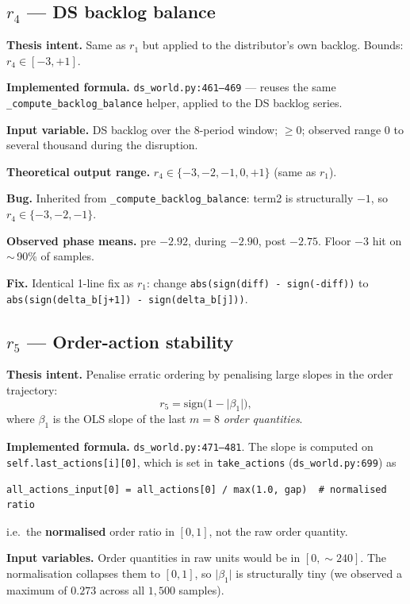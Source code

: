 \documentclass[11pt,letterpaper]{article}
\newcommand{\code}[1]{\texttt{\small #1}}
\begin{document}
\subsection{$r_4$ --- DS backlog balance}

\textbf{Thesis intent.}  Same as $r_1$ but applied to the distributor's own backlog.  Bounds: $r_4 \in [-3, +1]$.

\textbf{Implemented formula.}  \code{ds\_world.py:461--469} --- reuses the same \code{\_compute\_backlog\_balance} helper, applied to the DS backlog series.

\textbf{Input variable.}  DS backlog over the 8-period window; $\geq 0$; observed range $0$ to several thousand during the disruption.

\textbf{Theoretical output range.}  $r_4 \in \{-3, -2, -1, 0, +1\}$ (same as $r_1$).

\textbf{Bug.}  Inherited from \code{\_compute\_backlog\_balance}: term2 is structurally $-1$, so $r_4 \in \{-3, -2, -1\}$.

\textbf{Observed phase means.}  pre $-2.92$, during $-2.90$, post $-2.75$.  Floor $-3$ hit on $\sim$\,90\% of samples.

\textbf{Fix.}  Identical 1-line fix as $r_1$: change \code{abs(sign(diff) - sign(-diff))} to \code{abs(sign(delta\_b[j+1]) - sign(delta\_b[j]))}.

\subsection{$r_5$ --- Order-action stability}

\textbf{Thesis intent.}  Penalise erratic ordering by penalising large slopes in the order trajectory:
\[
r_5 = \mathrm{sign}\bigl(1 - \lvert \beta_1 \rvert\bigr),
\]
where $\beta_1$ is the OLS slope of the last $m=8$ \emph{order quantities}.

\textbf{Implemented formula.}  \code{ds\_world.py:471--481}.  The slope is computed on \code{self.last\_actions[i][0]}, which is set in \code{take\_actions} (\code{ds\_world.py:699}) as
\begin{lstlisting}
all_actions_input[0] = all_actions[0] / max(1.0, gap)  # normalised ratio
\end{lstlisting}
i.e.\ the \textbf{normalised} order ratio in $[0, 1]$, not the raw order quantity.

\textbf{Input variables.}  Order quantities in raw units would be in $[0, \sim 240]$.  The normalisation collapses them to $[0, 1]$, so $\lvert \beta_1 \rvert$ is structurally tiny (we observed a maximum of $0.273$ across all $1{,}500$ samples).
\end{document}
